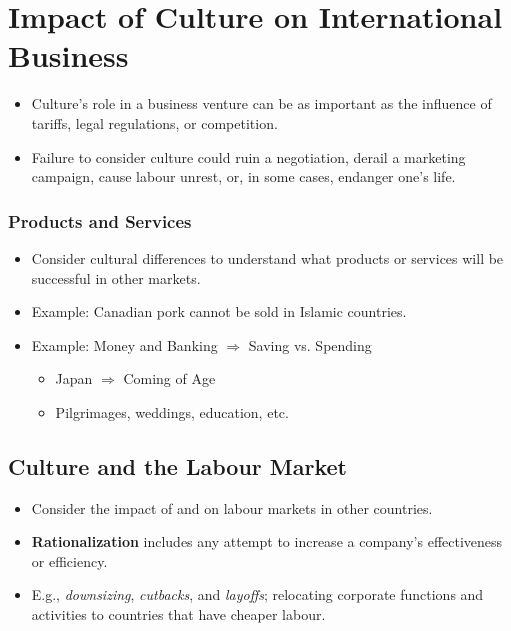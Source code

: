 \section{Impact of Culture on International Business}

\begin{itemize}
    \item Culture’s role in a business venture can be as
    important as the influence of tariffs, legal
    regulations, or competition.
    \item Failure to consider culture could ruin a negotiation,
    derail a marketing campaign, cause labour unrest,
    or, in some cases, endanger one’s life.
\end{itemize}

\subsubsection{Products and Services}
\begin{itemize}
    \item Consider cultural differences to understand what
    products or services will be successful in other
    markets.
    \item Example: Canadian pork cannot be sold in Islamic countries.
    \item Example: Money and Banking \(\Rightarrow\) Saving vs. Spending
    \begin{itemize}
        \item Japan \(\Rightarrow\) Coming of Age
        \item Pilgrimages, weddings, education, etc.
    \end{itemize}
\end{itemize}

\subsection{Culture and the Labour Market}
\begin{itemize}
    \item Consider the impact of and on labour markets in other countries.
    \item \textbf{Rationalization} includes any attempt to increase a company's effectiveness or efficiency.
    \item E.g., \textit{downsizing}, \textit{cutbacks}, and \textit{layoffs}; relocating corporate functions and activities to countries that have cheaper labour.
\end{itemize}

